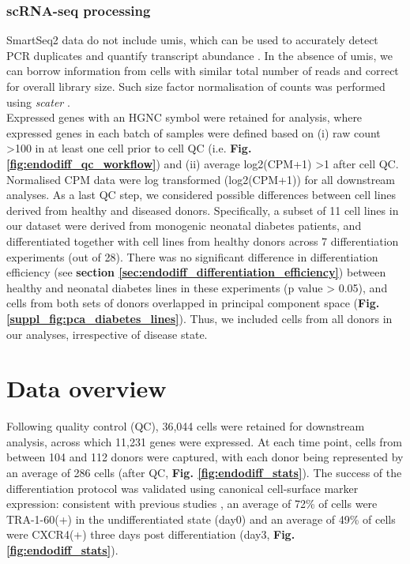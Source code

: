 \subsubsection{scRNA-seq processing}

SmartSeq2 data do not include \glspl{umi}, which can be used to accurately detect PCR duplicates and quantify transcript abundance \cite{smith2017umi, islam2014quantitative, kivioja2012counting}. 
In the absence of \glspl{umi}, we can borrow information from cells with similar total number of reads and correct for overall library size. 
Such size factor normalisation of counts was performed using \textit{scater} \cite{mccarthy2017scater}. \\

Expressed genes with an HGNC symbol were retained for analysis, where expressed genes in each batch of samples were defined based on (i) raw count >100 in at least one cell prior to cell QC (i.e. \textbf{Fig. \ref{fig:endodiff_qc_workflow}}) and (ii) average log2(CPM+1) >1 after cell QC. 
Normalised CPM data were log transformed (log2(CPM+1)) for all downstream analyses. 
As a last QC step, we considered possible differences between cell lines derived from healthy and diseased donors. 
Specifically, a subset of 11 cell lines in our dataset were derived from monogenic neonatal diabetes patients, and differentiated together with cell lines from healthy donors across 7 differentiation experiments (out of 28). 
There was no significant difference in differentiation efficiency (see \textbf{section \ref{sec:endodiff_differentiation_efficiency}}) between healthy and neonatal diabetes lines in these experiments (p value > 0.05), and cells from both sets of donors overlapped in principal component space (\textbf{Fig. \ref{suppl_fig:pca_diabetes_lines}}). 
Thus, we included cells from all donors in our analyses, irrespective of disease state.

\newpage

\section{Data overview}
\label{sec:endodiff_overview}

Following quality control (QC), 36,044 cells were retained for downstream analysis, across which 11,231 genes were expressed.
At each time point, cells from between 104 and 112 donors were captured, with each donor being represented by an average of 286 cells (after QC, \textbf{Fig. \ref{fig:endodiff_stats}}). 
The success of the differentiation protocol was validated using canonical cell-surface marker expression: consistent with previous studies \cite{chu2016single}, an average of 72\% of cells were TRA-1-60(+) in the undifferentiated state (day0) and an average of 49\% of cells were CXCR4(+) three days post differentiation (day3, \textbf{Fig. \ref{fig:endodiff_stats}}).
 
